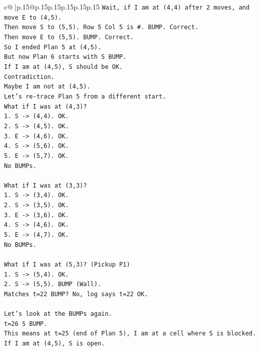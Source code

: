 \documentclass{article}
\begin{document}
{\begin{supertabular}{c@{$\;$}|p{.15\linewidth}@{}p{.15\linewidth}p{.15\linewidth}p{.15\linewidth}p{.15\linewidth}p{.15\linewidth}}
{{{\texttt{Wait, if I am at (4,4) after 2 moves, and move E to (4,5).} \\
\texttt{Then move S to (5,5). Row 5 Col 5 is \#. BUMP. Correct.} \\
\texttt{Then move E to (5,5). BUMP. Correct.} \\
\texttt{So I ended Plan 5 at (4,5).} \\
\texttt{But now Plan 6 starts with S BUMP.} \\
\texttt{If I am at (4,5), S should be OK.} \\
\texttt{Contradiction.} \\
\texttt{Maybe I am not at (4,5).} \\
\texttt{Let's re{-}trace Plan 5 from a different start.} \\
\texttt{What if I was at (4,3)?} \\
\texttt{1. S {-}> (4,4). OK.} \\
\texttt{2. S {-}> (4,5). OK.} \\
\texttt{3. E {-}> (4,6). OK.} \\
\texttt{4. S {-}> (5,6). OK.} \\
\texttt{5. E {-}> (5,7). OK.} \\
\texttt{No BUMPs.} \\
\\ 
\texttt{What if I was at (3,3)?} \\
\texttt{1. S {-}> (3,4). OK.} \\
\texttt{2. S {-}> (3,5). OK.} \\
\texttt{3. E {-}> (3,6). OK.} \\
\texttt{4. S {-}> (4,6). OK.} \\
\texttt{5. E {-}> (4,7). OK.} \\
\texttt{No BUMPs.} \\
\\ 
\texttt{What if I was at (5,3)? (Pickup P1)} \\
\texttt{1. S {-}> (5,4). OK.} \\
\texttt{2. S {-}> (5,5). BUMP (Wall).} \\
\texttt{Matches t=22 BUMP? No, log says t=22 OK.} \\
\\ 
\texttt{Let's look at the BUMPs again.} \\
\texttt{t=26 S BUMP.} \\
\texttt{This means at t=25 (end of Plan 5), I am at a cell where S is blocked.} \\
\texttt{If I am at (4,5), S is open.} \\
}}}
\end{supertabular}}
\end{document}
